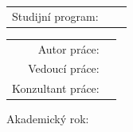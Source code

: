 \usepackage{dirtytalk}


\thispagestyle{empty}


\renewcommand{\thepage}{\CoverName}	%
\begin{center}			
	\MakeUppercase{\LARGE{\skolaCZ}} \par
	\MakeUppercase{\Large{}}
	\vspace{10mm}
	
	\begin{tabular}{rll}
		Studijní program:& \programN & \programCZ \\[3pt]  
	\end{tabular}
	
	\vspace{10mm} 
	\logoSkola 
	\vspace{10mm} 
	
	{\huge \MakeUppercase{\tb{\druhCZ}}\par}
	\vspace{5mm} 
	{\Large \MakeUppercase{\nazevCZ}}
	
	\vfill
	{\large
		\begin{tabular}{rl}
			Autor práce: & \tb{\Atituly\,\Ajmeno\ \MakeUppercase{\Aprijmeni}}\\
			Vedoucí práce: & \tb{\VtitulyP\,\Vjmeno\ \MakeUppercase{\Vprijmeni},\,\VtitulyZ}\\ 
			Konzultant práce: & \tb{\KtitulyP\,\Kjmeno\ \MakeUppercase{\Kprijmeni},\,\KtitulyZ}\\
		\end{tabular}
	
		\vspace{20mm} 
		Akademický rok: \tb{\rok}}
	\vspace{40mm} 
\end{center}
\clearpage   
